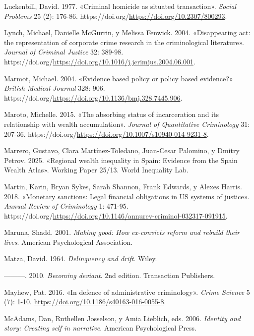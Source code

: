 \documentclass[
  spanish,
  letterpaper,
  DIV=11,
  numbers=noendperiod]{scrreprt}
\newlength{\cslhangindent}
\newenvironment{CSLReferences}[2] %
 {\begin{list}{}{%
  \setlength{\itemindent}{0pt}
  \setlength{\leftmargin}{0pt}
  \setlength{\parsep}{0pt}
  \ifodd #1
   \setlength{\leftmargin}{\cslhangindent}
   \setlength{\itemindent}{-1\cslhangindent}
  \fi
  \setlength{\itemsep}{#2\baselineskip}}}
 {\end{list}}
\begin{document}
\begin{CSLReferences}{1}{0}
Luckenbill, David. 1977. {«Criminal homicide as situated transaction»}.
\emph{Social Problems} 25 (2): 176-86.
https://doi.org/\url{https://doi.org/10.2307/800293}.

Lynch, Michael, Danielle McGurrin, y Melissa Fenwick. 2004.
{«Disappearing act: the representation of corporate crime research in
the criminological literature»}. \emph{Journal of Criminal Justice} 32:
389-98.
https://doi.org/\url{https://doi.org/10.1016/j.jcrimjus.2004.06.001}.

Marmot, Michael. 2004. {«Evidence based policy or policy based
evidence?»} \emph{British Medical Journal} 328: 906.
https://doi.org/\url{https://doi.org/10.1136/bmj.328.7445.906}.

Maroto, Michelle. 2015. {«The absorbing status of incarceration and its
relationship with wealth accumulation»}. \emph{Journal of Quantitative
Criminology} 31: 207-36.
https://doi.org/\url{https://doi.org/10.1007/s10940-014-9231-8}.

Marrero, Gustavo, Clara Martínez-Toledano, Juan-Cesar Palomino, y Dmitry
Petrov. 2025. {«Regional wealth inequality in Spain: Evidence from the
Spain Wealth Atlas»}. Working Paper 25/13. World Inequality Lab.

Martin, Karin, Bryan Sykes, Sarah Shannon, Frank Edwards, y Alexes
Harris. 2018. {«Monetary sanctions: Legal financial obligations in US
systems of justice»}. \emph{Annual Review of Criminology} 1: 471-95.
https://doi.org/\url{https://doi.org/10.1146/annurev-criminol-032317-091915}.

Maruna, Shadd. 2001. \emph{Making good: How ex-convicts reform and
rebuild their lives}. American Psychological Association.

Matza, David. 1964. \emph{Delinquency and drift}. Wiley.

---------. 2010. \emph{Becoming deviant}. 2nd edition. Transaction
Publishers.

Mayhew, Pat. 2016. {«In defence of administrative criminology»}.
\emph{Crime Science} 5 (7): 1-10.
\url{https://doi.org/10.1186/s40163-016-0055-8}.

McAdams, Dan, Ruthellen Josselson, y Amia Lieblich, eds. 2006.
\emph{Identity and story: Creating self in narrative}. American
Psychological Press.


\end{CSLReferences}
\end{document}
